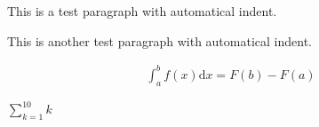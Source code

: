 \documentclass{homework}
\begin{document}


    This is a test paragraph with automatical indent.
    
    This is another test paragraph with automatical indent.

\begin{align}
     \int_a^bf(x)\mathrm{d}x=F(b)-F(a)
\end{align}

$\sum_{k=1}^{10}k$
\end{document}
